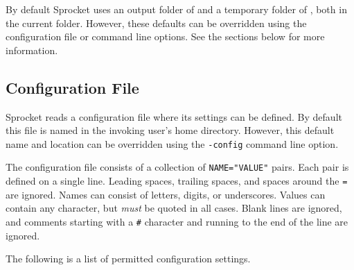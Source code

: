 By default Sprocket uses an output folder of  and a temporary folder of
, both in the current folder. However, these defaults can be overridden
using the configuration file or command line options. See the sections below for more
information.

\subsection{Configuration File}

Sprocket reads a configuration file where its settings can be defined. By default this file is
named  in the invoking user's home directory. However, this default name and
location can be overridden using the \texttt{-config} command line option.

The configuration file consists of a collection of \texttt{NAME="VALUE"} pairs. Each pair is
defined on a single line. Leading spaces, trailing spaces, and spaces around the \texttt{=} are
ignored. Names can consist of letters, digits, or underscores. Values can contain any character,
but \emph{must} be quoted in all cases. Blank lines are ignored, and comments starting with a
\texttt{\#} character and running to the end of the line are ignored.

The following is a list of permitted configuration settings.


